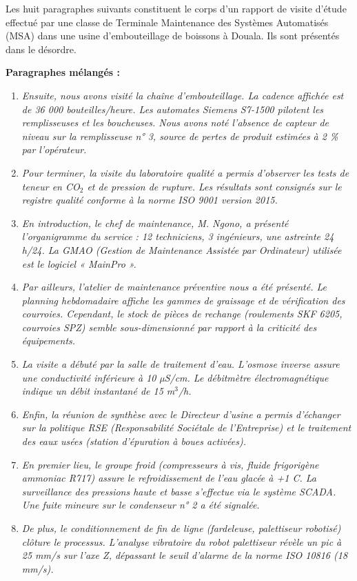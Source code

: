 \documentclass[11pt]{article}
\newcounter{popsec}
\newcounter{popsub}
\newcommand{\courssub}[1]{%
  \stepcounter{popsub}%
  \par\vspace{9pt}\noindent{\popxbold\fontsize{11.5}{13}\selectfont\color{popink}{\color{poporange}\thepopsec.\thepopsub}\hspace{6pt}#1}\par\nopagebreak\vspace{4pt}
}
\begin{document}
\courssub{Je me prépare au Bac}

\begin{exercice}
Les huit paragraphes suivants constituent le corps d'un rapport de visite d'étude effectué par une classe de Terminale Maintenance des Systèmes Automatisés (MSA) dans une usine d'embouteillage de boissons à Douala. Ils sont présentés dans le désordre.

\textbf{Paragraphes mélangés :}
\begin{enumerate}
\item[A.] \emph{Ensuite, nous avons visité la chaîne d'embouteillage. La cadence affichée est de 36 000 bouteilles/heure. Les automates Siemens S7-1500 pilotent les remplisseuses et les boucheuses. Nous avons noté l'absence de capteur de niveau sur la remplisseuse n° 3, source de pertes de produit estimées à 2 \% par l'opérateur.}
\item[B.] \emph{Pour terminer, la visite du laboratoire qualité a permis d'observer les tests de teneur en CO$_2$ et de pression de rupture. Les résultats sont consignés sur le registre qualité conforme à la norme ISO 9001 version 2015.}
\item[C.] \emph{En introduction, le chef de maintenance, M. Ngono, a présenté l'organigramme du service : 12 techniciens, 3 ingénieurs, une astreinte 24 h/24. La GMAO (Gestion de Maintenance Assistée par Ordinateur) utilisée est le logiciel « MainPro ».}
\item[D.] \emph{Par ailleurs, l'atelier de maintenance préventive nous a été présenté. Le planning hebdomadaire affiche les gammes de graissage et de vérification des courroies. Cependant, le stock de pièces de rechange (roulements SKF 6205, courroies SPZ) semble sous-dimensionné par rapport à la criticité des équipements.}
\item[E.] \emph{La visite a débuté par la salle de traitement d'eau. L'osmose inverse assure une conductivité inférieure à 10 µS/cm. Le débitmètre électromagnétique indique un débit instantané de 15 m$^3$/h.}
\item[F.] \emph{Enfin, la réunion de synthèse avec le Directeur d'usine a permis d'échanger sur la politique RSE (Responsabilité Sociétale de l'Entreprise) et le traitement des eaux usées (station d'épuration à boues activées).}
\item[G.] \emph{En premier lieu, le groupe froid (compresseurs à vis, fluide frigorigène ammoniac R717) assure le refroidissement de l'eau glacée à +1 \textdegree C. La surveillance des pressions haute et basse s'effectue via le système SCADA. Une fuite mineure sur le condenseur n° 2 a été signalée.}
\item[H.] \emph{De plus, le conditionnement de fin de ligne (fardeleuse, palettiseur robotisé) clôture le processus. L'analyse vibratoire du robot palettiseur révèle un pic à 25 mm/s sur l'axe Z, dépassant le seuil d'alarme de la norme ISO 10816 (18 mm/s).}
\end{enumerate}


\end{exercice}
\end{document}
